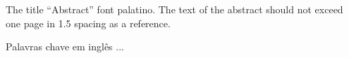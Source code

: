 \abstract 
The title ``Abstract'' font palatino. The text of the abstract should not exceed one page in 1.5 spacing as a reference.

\begin{keywords}
Palavras chave em inglês ...
\end{keywords} 
